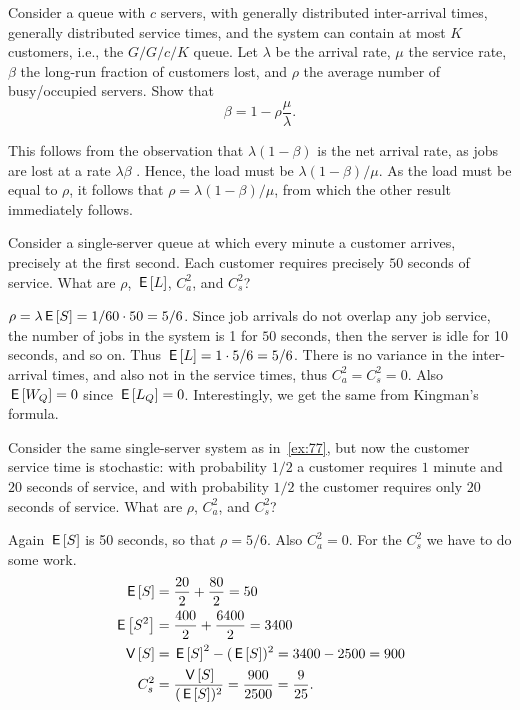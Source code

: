 \begin{exercise}
 Consider a queue with $c$ servers, with generally distributed inter-arrival times, generally distributed service times, and the system can contain at most $K$ customers, i.e., the $G/G/c/K$ queue.
 Let $\lambda$ be the arrival rate, $\mu$ the service rate, $\beta$ the long-run fraction of customers lost, and $\rho$ the average number of busy/occupied servers.
 Show that
 \begin{equation*}
 \beta = 1 - \rho\frac{\mu}{\lambda}.
 \end{equation*}
\begin{solution}
 This follows from the observation that $\lambda(1-\beta)$ is the net
 arrival rate, as jobs are lost at a rate $\lambda\beta$ . Hence, the
 load must be $\lambda(1-\beta)/\mu$. As the load must be equal to
 $\rho$, it follows that $\rho = \lambda(1-\beta)/\mu$, from which the
 other result immediately follows.
\end{solution}
\end{exercise}

\begin{exercise}
 Consider a single-server queue at which every minute a customer arrives, precisely at the first second.
 Each customer requires precisely $50$ seconds of service.
 What are $\rho$, $\,\mathsf{E}\left[L\right]$, $C_a^2$, and $C_s^2$?
\begin{solution}
 $\rho = \lambda \,\mathsf{E}\left[S\right] = 1/60 \cdot 50 = 5/6$.
 Since job arrivals do not overlap any job service, the number of jobs in the system is 1 for $50$ seconds, then the server is idle for 10 seconds, and so on.
 Thus $\,\mathsf{E}\left[L\right] = 1\cdot5/6 = 5/6$.
 There is no variance in the inter-arrival times, and also not in the service times, thus $C_a^2 = C_s^2 = 0$.
 Also $\,\mathsf{E}\left[W_Q\right]=0$ since $\,\mathsf{E}\left[L_Q\right]=0$.
 Interestingly, we get the same from Kingman's formula.
\end{solution}
\end{exercise}

\begin{exercise}
 Consider the same single-server system as in~\cref{ex:77}, but now the customer service time is stochastic: with probability $1/2$ a customer requires $1$ minute and $20$ seconds of service, and with probability $1/2$ the customer requires only $20$ seconds of service.
 What are $\rho$, $C_a^2$, and $C_s^2$?
\begin{solution}
 Again $\,\mathsf{E}\left[S\right]$ is 50 seconds, so that $\rho = 5/6$. Also
 $C_a^2=0$. For the $C_s^2$ we have to do some work. 
 \begin{equation*}
 \begin{split}
 \,\mathsf{E}\left[S\right] &= \frac{20}2 + \frac{80}2 = 50 \\
 \,\mathsf{E}\left[S^2\right] &= \frac{400}2 + \frac{6400} 2 = 3400 \\
 \,\mathsf{V}\left[S\right] &= \,\mathsf{E}\left[S\right]^2 - (\,\mathsf{E}\left[S\right])^2 = 3400 - 2500 = 900 \\
 C_s^2 &= \frac{\,\mathsf{V}\left[S\right]}{(\,\mathsf{E}\left[S\right])^2} = \frac{900}{2500}=\frac{9}{25}.
 \end{split}
 \end{equation*}
\end{solution}
\end{exercise}

